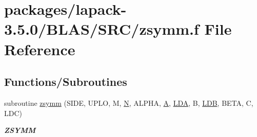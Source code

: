 \hypertarget{lapack-3_85_80_2BLAS_2SRC_2zsymm_8f}{}\section{packages/lapack-\/3.5.0/\+B\+L\+A\+S/\+S\+R\+C/zsymm.f File Reference}
\label{lapack-3_85_80_2BLAS_2SRC_2zsymm_8f}
\subsection*{Functions/\+Subroutines}
\begin{DoxyCompactItemize}
\item 
subroutine \hyperlink{group__complex16__blas__level3_ga263a46a500f5c7f04bee1b75ea7f64f6}{zsymm} (S\+I\+D\+E, U\+P\+L\+O, M, \hyperlink{polmisc_8c_a0240ac851181b84ac374872dc5434ee4}{N}, A\+L\+P\+H\+A, \hyperlink{classA}{A}, \hyperlink{example__user_8c_ae946da542ce0db94dced19b2ecefd1aa}{L\+D\+A}, B, \hyperlink{example__user_8c_a50e90a7104df172b5a89a06c47fcca04}{L\+D\+B}, B\+E\+T\+A, C, L\+D\+C)
\begin{DoxyCompactList}\small\item\em {\bfseries Z\+S\+Y\+M\+M} \end{DoxyCompactList}\end{DoxyCompactItemize}
